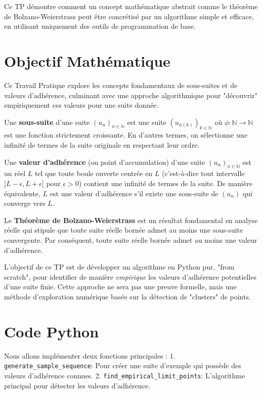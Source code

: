 \documentclass{report}
\begin{document}
Ce TP démontre comment un concept mathématique abstrait comme le théorème de Bolzano-Weierstrass peut être concrétisé par un algorithme simple et efficace, en utilisant uniquement des outils de programmation de base.

\newpage


\section*{Objectif Mathématique}

Ce Travail Pratique explore les concepts fondamentaux de sous-suites et de valeurs d'adhérence, culminant avec une approche algorithmique pour "découvrir" empiriquement ces valeurs pour une suite donnée.

Une \textbf{sous-suite} d'une suite $(u_n)_{n \in \mathbb{N}}$ est une suite $(u_{\phi(k)})_{k \in \mathbb{N}}$ où $\phi: \mathbb{N} \to \mathbb{N}$ est une fonction strictement croissante. En d'autres termes, on sélectionne une infinité de termes de la suite originale en respectant leur ordre.

Une \textbf{valeur d'adhérence} (ou point d'accumulation) d'une suite $(u_n)_{n \in \mathbb{N}}$ est un réel $L$ tel que toute boule ouverte centrée en $L$ (c'est-à-dire tout intervalle $]L-\epsilon, L+\epsilon[$ pour $\epsilon > 0$) contient une infinité de termes de la suite. De manière équivalente, $L$ est une valeur d'adhérence s'il existe une sous-suite de $(u_n)$ qui converge vers $L$.

Le \textbf{Théorème de Bolzano-Weierstrass} est un résultat fondamental en analyse réelle qui stipule que toute suite réelle bornée admet au moins une sous-suite convergente. Par conséquent, toute suite réelle bornée admet au moins une valeur d'adhérence.

L'objectif de ce TP est de développer un algorithme en Python pur, "from scratch", pour identifier de manière \textit{empirique} les valeurs d'adhérence potentielles d'une suite finie. Cette approche ne sera pas une preuve formelle, mais une méthode d'exploration numérique basée sur la détection de "clusters" de points.

\section*{Code Python}

Nous allons implémenter deux fonctions principales :
1.  \texttt{generate\_sample\_sequence}: Pour créer une suite d'exemple qui possède des valeurs d'adhérence connues.
2.  \texttt{find\_empirical\_limit\_points}: L'algorithme principal pour détecter les valeurs d'adhérence.
\end{document}
